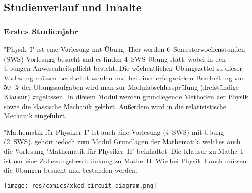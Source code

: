 \begin{multicols}{2}
\subsection*{Studienverlauf und Inhalte}
\subsubsection*{Erstes Studienjahr}
"Physik~I" ist eine Vorlesung mit Übung. Hier werden 6~Semesterwochenstunden (SWS) Vorlesung besucht und es finden \SI{4}{SWS} Übung statt, wobei in den Übungen Anwesenheitspflicht besteht. Die wöchentlichen Übungszettel zu dieser Vorlesung müssen bearbeitet werden und bei einer erfolgreichen Bearbeitung von \SI{50}{\percent} der Übungsaufgaben wird man zur Modulabschlussprüfung (dreistündige Klausur) zugelassen. In diesem Modul werden grundlegende Methoden der Physik sowie die klassische Mechanik gelehrt. Außerdem wird in die relativistische Mechanik eingeführt.

"Mathematik für Physiker~I" ist auch eine Vorlesung (\SI{4}{SWS}) mit Übung (\SI{2}{SWS}), gehört jedoch zum Modul Grundlagen der Mathematik, welches auch die Vorlesung "Mathematik für Physiker~II" beinhaltet. Die Klausur zu Mathe~I ist nur eine Zulassungsbeschränkung zu Mathe~II. Wie bei Physik~I auch müssen die Übungen besucht und bestanden werden.

\vspace{\fill}
\texttt{[image: res/comics/xkcd\_circuit\_diagram.png]}

\begin{table*}
\let\fibnl\par
\setlength{\temp}{0.2\textwidth}
\renewcommand{\multirowsetup}{\centering}


\end{table*}
\end{multicols}
